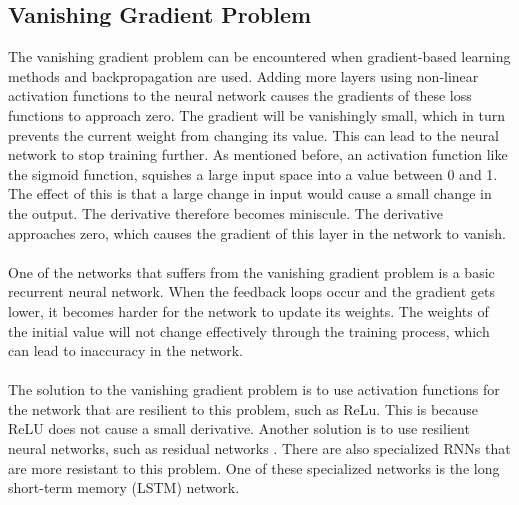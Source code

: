 \subsection{Vanishing Gradient Problem}\label{vgp}
The vanishing gradient problem can be encountered when gradient-based learning methods and backpropagation are used. Adding more layers using non-linear activation functions to the neural network causes the gradients of these loss functions to approach zero. The gradient will be vanishingly small, which in turn prevents the current weight from changing its value. This can lead to the neural network to stop training further. As mentioned before, an activation function like the sigmoid function, squishes a large input space into a value between 0 and 1. The effect of this is that a large change in input would cause a small change in the output. The derivative therefore becomes miniscule. The derivative approaches zero, which causes the gradient of this layer in the network to vanish. \\\\
One of the networks that suffers from the vanishing gradient problem is a basic recurrent neural network. When the feedback loops occur and the gradient gets lower, it becomes harder for the network to update its weights. The weights of the initial value will not change effectively through the training process, which can lead to inaccuracy in the network. \\\\
The solution to the vanishing gradient problem is to use activation functions for the network that are resilient to this problem, such as ReLu. This is because ReLU does not cause a small derivative. Another solution is to use resilient neural networks, such as residual networks \cite{DBLP:journals/corr/HeZRS15}. There are also specialized RNNs that are more resistant to this problem. One of these specialized networks is the long short-term memory (LSTM) network. 

